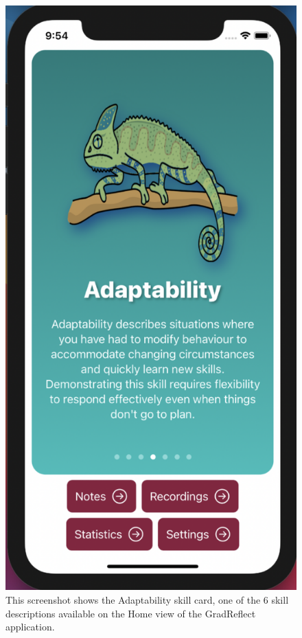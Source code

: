\documentclass{l4proj}
\begin{document}
\begin{figure}
    \centering
    \includegraphics[scale=0.4]{images/AdaptabilitySkillCard.pdf}    
    \caption{This screenshot shows the Adaptability skill card, one of the 6 skill descriptions available on the Home view of the GradReflect application.}
    \label{fig:AdaptabilitySkillCard} 
\end{figure}
\end{document}

